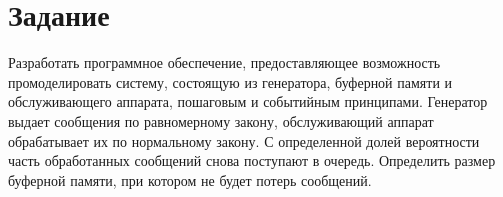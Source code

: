 \chapter{Задание}

Разработать программное обеспечение, предоставляющее возможность промоделировать
систему, состоящую из генератора, буферной памяти и обслуживающего аппарата,
пошаговым и событийным принципами. Генератор выдает сообщения по равномерному
закону, обслуживающий аппарат обрабатывает их по нормальному закону.  С
определенной долей вероятности часть обработанных сообщений снова поступают в
очередь.  Определить размер буферной памяти, при котором не будет потерь
сообщений.


